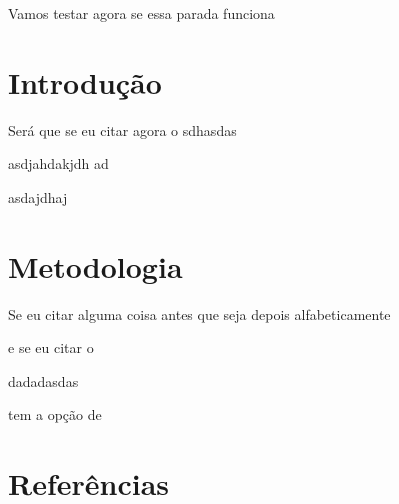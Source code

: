 \documentclass[10pt,a4paper]{article}
\begin{document}
	
	Vamos testar agora se essa parada funciona
	
	\section{Introdução}
	Será que se eu citar agora o \cite{Bacchin2006}
	sdhasdas 
	
	asdjahdakjdh ad
	
	asdajdhaj
	
	\section{Metodologia}
	Se eu citar alguma coisa antes que seja depois alfabeticamente \cite{Ghangrekar2005}
	
	e se eu citar o \cite{Ferreira2013}
	
	dadadasdas
	
	tem a opção de  \textcite{Morais2016}
	
	\cites{Morais2016a}{Yu2001}
	

	
	\section{Referências}
	
	\printbibliography
	
\end{document}
